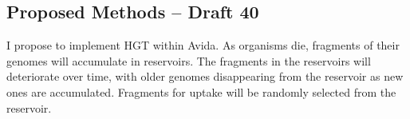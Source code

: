 \subsection{Proposed Methods – Draft 40}

I propose to implement HGT within Avida.  As organisms die, fragments of their genomes will accumulate in reservoirs.  The fragments in the reservoirs will deteriorate over time, with older genomes disappearing from the reservoir as new ones are accumulated. Fragments for uptake will be randomly selected from the reservoir.  

